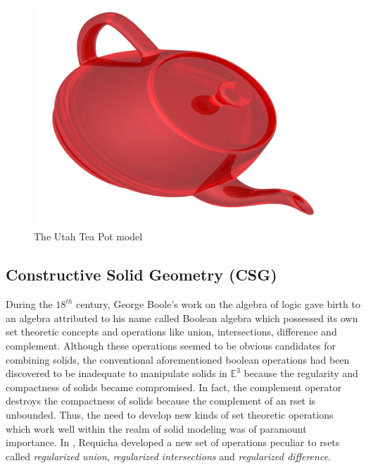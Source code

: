 \begin{figure}[htbp]
\centering
\includegraphics[trim=0.0cm 0.3cm 0.3cm 0.3cm, clip=true, totalheight=0.5\textheight]{Pictures/Teapot.png}
\caption[The Utah Tea Pot model]{The Utah Tea Pot model}
\label{Teapot}
\end{figure}
 
\subsection{Constructive Solid Geometry (CSG)}

\hspace{30} During   the   $18^{th}$   century,   George   Boole's   work   on   the   algebra   of   logic   gave  
birth   to   an   algebra   attributed   to   his   name   called   Boolean   algebra   which  
possessed   its   own   set   theoretic   concepts   and   operations   like   union,  
intersections,   difference   and   complement.   Although   these   operations  
seemed   to   be   obvious   candidates   for   combining   solids,   the   conventional  
aforementioned   boolean   operations   had   been   discovered   to   be   inadequate   to  
manipulate   solids   in   $\mathbb{E}^3$ because   the   regularity  
and   compactness   of   solids   became   compromised.   In   fact,   the   complement  
operator   destroys   the   compactness   of   solids   because   the   complement   of   an  
r­set   is   unbounded.   Thus,   the   need   to   develop   new   kinds   of   set   theoretic  
operations   which   work   well   within   the   realm   of   solid   modeling   was   of   paramount  
importance.   In   \cite{23},   Requicha   developed   a   new   set   of   operations   peculiar   to  
r­sets   called   \textit{regularized   union},   \textit{regularized   intersections}   and   \textit{regularized  
difference}.

